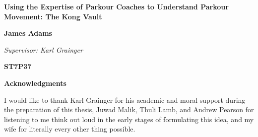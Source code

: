 

% 


\thispagestyle{empty}
\begin{center}
\vspace*{5cm}
{\headerfont\huge\bfseries Using the Expertise of Parkour Coaches to Understand Parkour Movement: The Kong Vault}

\textbf{James Adams}

\textit{Supervisor: Karl Grainger}

\vfill

\textbf{ST7P37}

\end{center}

\newpage


\setcounter{page}{1}

\thispagestyle{empty}
\begin{center}
\vspace*{5cm}
{\headerfont\large\bfseries Acknowledgments}
\end{center}

I would like to thank Karl Grainger for his academic and moral support during the preparation of this thesis, Juwad Malik, Thuli Lamb, and Andrew Pearson for listening to me think out loud in the early stages of formulating this idea, and my wife for literally every other thing possible.

\newpage


